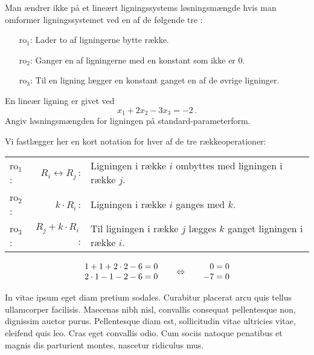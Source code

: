 \begin{theorem}\label{TN2.6}
Man ændrer ikke på et lineært ligningssystems løsningsmængde hvis man omformer ligningssystemet ved en af de følgende tre :
\begin{enumerate}
\item[ro$_1$:] Lader to af ligningerne bytte række.
\item[ro$_2$:] Ganger en af ligningerne med en konstant som ikke er 0.
\item[ro$_3$:] Til en ligning lægger en konstant ganget en af de øvrige ligninger.
\end{enumerate}
\end{theorem}



\begin{lemma}
En lineær ligning er givet ved
\begin{equation}
x_1+2x_2-3x_3=-2\,.
\end{equation}
Angiv løsningsmængden for ligningen på standard-parameterform.
\end{lemma}



\begin{corollary}
Vi fastlægger her en kort notation for hver af de tre rækkeoperationer: \medskip \\
\begin{tabular}{lrl}
ro$_1$:& $R_i\leftrightarrow R_j\,$:& Ligningen i række $i$ ombyttes med ligningen i række $j$.\medskip \\ 
ro$_2$:&$k\cdot R_i\,$:& Ligningen i række $i$ ganges med $k$.\medskip \\ 
ro$_3$:&$R_j+k\cdot R_i\,$:& Til ligningen i række $j$ lægges $k$ ganget ligningen i række $i$.
\end{tabular}
\end{corollary}


\begin{method}

\begin{equation}
\begin{array}{r}
1+1+2\cdot 2-6=0\\
2\cdot 1-1-2-6=0
\end{array}
\hspace{0.5cm}\Leftrightarrow \hspace{0.5cm}
\begin{array}{r}
0=0\\
-7=0
\end{array}
\end{equation}

In vitae ipsum eget diam pretium sodales. Curabitur placerat arcu quis tellus ullamcorper facilisis. Maecenas nibh nisl, convallis consequat pellentesque non, dignissim auctor purus. Pellentesque diam est, sollicitudin vitae ultricies vitae, eleifend quis leo. Cras eget convallis odio. Cum sociis natoque penatibus et magnis dis parturient montes, nascetur ridiculus mus. 
\end{method}



